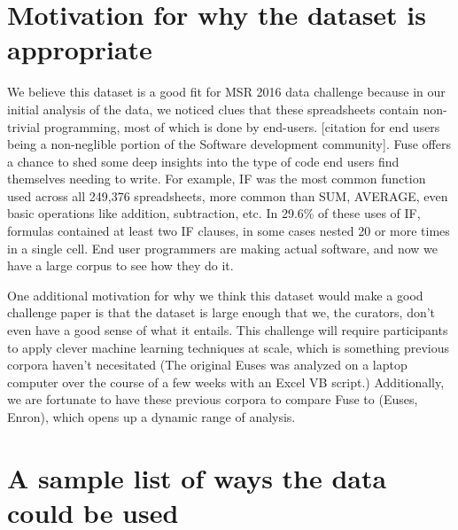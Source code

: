 \documentclass[conference]{IEEEtran}
\newcommand{\xlscount}{249,376}
\begin{document}



\section{Motivation for why the dataset is appropriate}

We believe this dataset is a good fit for MSR 2016 data challenge because in our initial analysis of the data, we noticed clues that these spreadsheets contain non-trivial programming, most of which is done by end-users.
[citation for end users being a non-neglible portion of the Software development community].  
Fuse offers a chance to shed some deep insights into the type of code end users find themselves needing to write.
For example, IF was the most common function used across all \xlscount{} spreadsheets, more common than SUM, AVERAGE, even basic operations like addition, subtraction, etc.
In 29.6\% of these uses of IF, formulas contained at least two IF clauses, in some cases nested 20 or more times in a single cell.
End user programmers are making actual software, and now we have a large corpus to see how they do it.

One additional motivation for why we think this dataset would make a good challenge paper is that the dataset is large enough that we, the curators, don't even have a good sense of what it entails.
This challenge will require participants to apply clever machine learning techniques at scale, which is something previous corpora haven't necesitated (The original Euses was analyzed on a laptop computer over the course of a few weeks with an Excel VB script.)
Additionally, we are fortunate to have these previous corpora to compare Fuse to (Euses, Enron), which opens up a dynamic range of analysis.


\section{A sample list of ways the data could be used}
\end{document}
